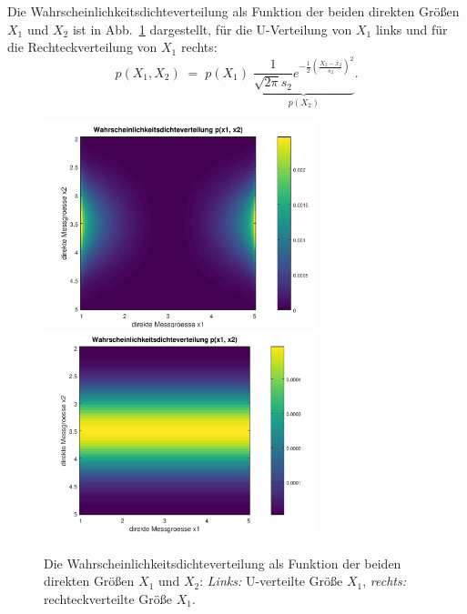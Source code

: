 Die Wahrscheinlichkeitsdichteverteilung als Funktion der beiden direkten Größen $X_1$
und $X_2$ ist in Abb.~\ref{pdfx1x2} dargestellt, für die U-Verteilung von $X_1$ links
und für die Rechteckverteilung von $X_1$ rechts:
\begin{equation}
p(X_1, X_2) \; = \; p(X_1) \; \underbrace{\frac{1}{\sqrt{2\pi} s_2}
	e^{-\frac{1}{2}\left(\frac{X_2 - \bar x_2}{s_2}\right)^2} }_{p(X_2)}.
\end{equation}
\begin{figure}
	\begin{center}
		\includegraphics[width=80mm]{11_vorlesung_GUMS1/media/direkte_x1_x2.png}
		\hspace{2mm}
		\includegraphics[width=80mm]{11_vorlesung_GUMS1/media/direkte_x1_x2_box.png}
		\caption{Die Wahrscheinlichkeitsdichteverteilung als Funktion der beiden direkten Größen $X_1$
			und $X_2$: \textsl{Links:} U-verteilte Größe $X_1$,
			\textsl{rechts:} rechteckverteilte Größe $X_1$.}
		\label{pdfx1x2}
	\end{center}
\end{figure}

